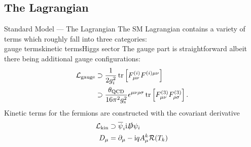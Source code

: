 \subsection{The Lagrangian}
\begin{frame}{Standard Model — The Lagrangian}
The SM Lagrangian contains a variety of terms which roughly fall into three categories:\\
\vfill
gauge terms\hfill kinetic terms\hfill Higgs sector\hfill\hfill
\vfill
The gauge part is straightforward albeit there being additional gauge configurations:
\begin{align}
  \mathcal{L}_\text{gauge}&\supset\frac1{2g_i^2}\tr\left[F^{(i)}_{\mu\nu}F^{(i)\mu\nu}\right]\\
  &\supset\frac{\theta_\mathrm{QCD}}{16\pi^2g_\mathrm{s}^2}\epsilon^{\mu\nu\rho\sigma}\tr\left[F^{(3)}_{\mu\nu}F^{(3)}_{\rho\sigma}\right].
\end{align}
Kinetic terms for the fermions are constructed with the covariant derivative
\begin{align}
  \mathcal{L}_\mathrm{kin}&\supset\overline{\psi}_i\mathrm{i}\slashed{D}\psi_i\\
  D_\mu&=\partial_\mu-\mathrm{i} qA^k_\mu\mathcal{R}(T_k)
\end{align}
\end{frame}


